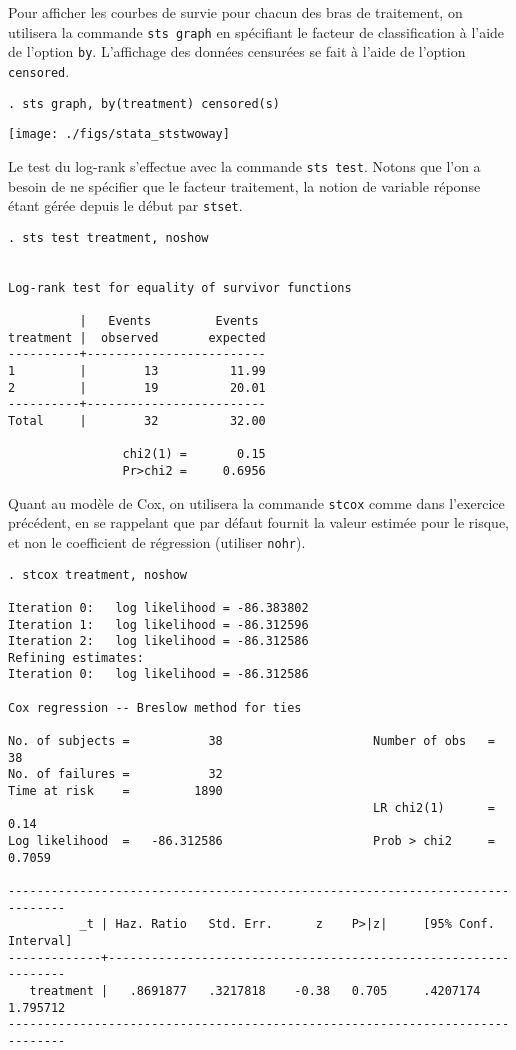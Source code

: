 Pour afficher les courbes de survie pour chacun des bras de traitement, on
utilisera la commande \texttt{sts graph} en spécifiant le facteur de
classification à l'aide de l'option \texttt{by}. L'affichage des données
censurées se fait à l'aide de l'option \texttt{censored}.
\begin{verbatim}
. sts graph, by(treatment) censored(s)
\end{verbatim}

\texttt{[image: ./figs/stata\_ststwoway]}

Le test du log-rank s'effectue avec la commande \texttt{sts test}. Notons
que l'on a besoin de ne spécifier que le facteur traitement, la notion de
variable réponse étant gérée depuis le début par \verb|stset|.
\begin{verbatim}
. sts test treatment, noshow


Log-rank test for equality of survivor functions

          |   Events         Events
treatment |  observed       expected
----------+-------------------------
1         |        13          11.99
2         |        19          20.01
----------+-------------------------
Total     |        32          32.00

                chi2(1) =       0.15
                Pr>chi2 =     0.6956
\end{verbatim}

Quant au modèle de Cox, on utilisera la commande \verb|stcox| comme dans
l'exercice précédent, en se rappelant que par défaut \Stata fournit la
valeur estimée pour le risque, et non le coefficient de régression (utiliser
\verb|nohr|). 
\begin{verbatim}
. stcox treatment, noshow

Iteration 0:   log likelihood = -86.383802
Iteration 1:   log likelihood = -86.312596
Iteration 2:   log likelihood = -86.312586
Refining estimates:
Iteration 0:   log likelihood = -86.312586

Cox regression -- Breslow method for ties

No. of subjects =           38                     Number of obs   =        38
No. of failures =           32
Time at risk    =         1890
                                                   LR chi2(1)      =      0.14
Log likelihood  =   -86.312586                     Prob > chi2     =    0.7059

------------------------------------------------------------------------------
          _t | Haz. Ratio   Std. Err.      z    P>|z|     [95% Conf. Interval]
-------------+----------------------------------------------------------------
   treatment |   .8691877   .3217818    -0.38   0.705     .4207174    1.795712
------------------------------------------------------------------------------
\end{verbatim}
\label{stop:sol4stata}

